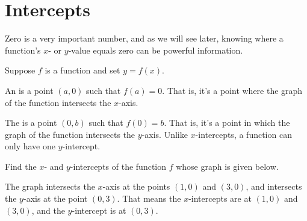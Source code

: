 \documentclass[noauthor, nooutcomes]{ximera}
\begin{document}
\section{Intercepts}
Zero is a very important number, and as we will see later, knowing where a function's $x$- or $y$-value equals zero can be powerful information. 

\begin{definition}[Intercepts]
	Suppose $f$ is a function and set $y=f(x)$.

	An  is a point $(a,0)$ such that $f(a) = 0$. That is, it's a 
	point where the graph of the function intersects the $x$-axis. 

	The  is a point $(0,b)$ such that $f(0) = b$. That is, it's a 
	point in which the graph of the function intersects the $y$-axis. Unlike 
	$x$-intercepts, a function can only have one $y$-intercept.
\end{definition}


\begin{example}
	Find the $x$- and $y$-intercepts of the function $f$ whose graph is given below.
	\begin{image}
	\end{image}
	\begin{explanation}
		The graph intersects the $x$-axis at the points $(1,0)$ and $(3,0)$, and intersects the $y$-axis at the point $(0,3)$.
		That means the $x$-intercepts are at $(1,0)$ and $(3, 0)$, and the $y$-intercept is at $(0, 3)$.
	\end{explanation}
\end{example}
\end{document}
